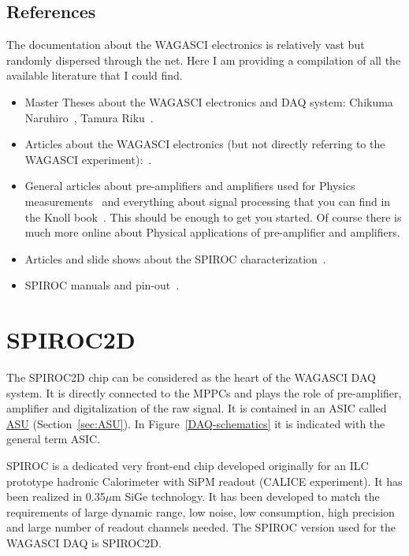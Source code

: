 \subsection{References}
The documentation about the WAGASCI electronics is relatively vast but randomly
dispersed through the net. Here I am providing a compilation of all the
available literature that I could find.

\begin{itemize}
\item Master Theses about the WAGASCI electronics and DAQ system: Chikuma
  Naruhiro~\cite{Chikuma:2016}, Tamura Riku~\cite{Tamura:2018}.
\item Articles about the WAGASCI electronics (but not directly referring to the
  WAGASCI experiment):~\cite{Gastaldi:2014vaa,Gastaldi:2014oid,GDCC:2012}.
\item General articles about pre-amplifiers and amplifiers used for Physics
  measurements~\cite{Hamamatsu:2001,Bertuccio:1996,Lioliou:2015,Ortec} and
  everything about signal processing that you can find in the Knoll
  book~\cite{Knoll:2010radiation}. This should be enough to get you started. Of
  course there is much more online about Physical applications of pre-amplifier
  and amplifiers.  
\item Articles and slide shows about the SPIROC
  characterization~\cite{Callier:2008,Callier:2009,Fabbri:2009,%
    Callier:2013,Callier:2015}.
\item SPIROC manuals and
  pin-out~\cite{SPIROC2Dpinlist,SPIROC2Ddatasheet,SPIROC:OMEGA}.
\end{itemize}

\section{SPIROC2D}
The SPIROC2D chip can be considered as the heart of the WAGASCI DAQ system. It
is directly connected to the MPPCs and plays the role of pre-amplifier,
amplifier and digitalization of the raw signal. It is contained in an ASIC
called \hyperref[sec:ASU]{ASU} (Section~\ref{sec:ASU}). In
Figure~\ref{DAQ-schematics} it is indicated with the general term ASIC.
  
SPIROC is a dedicated very front-end chip developed originally for an ILC
prototype hadronic Calorimeter with SiPM readout (CALICE experiment). It has
been realized in 0.35$\mu$m SiGe technology. It has been developed to match the
requirements of large dynamic range, low noise, low consumption, high precision
and large number of readout channels needed. The SPIROC version used for the
WAGASCI DAQ is SPIROC2D.


